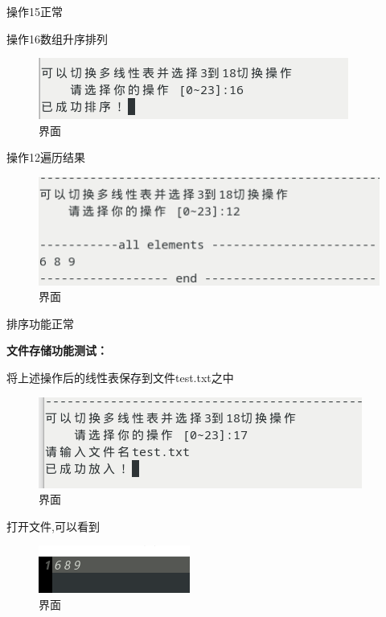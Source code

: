 \documentclass[supercite]{Experimental_Report}
\theoremstyle{definition}
\begin{document}
操作15正常

操作16数组升序排列

\begin{figure}[!htb]
	\begin{center}
		\includegraphics[scale=0.60]{images/1-27.png}
		\caption{界面}
		\label{fig1-27}
		\end{center}
\end{figure}

操作12遍历结果

\begin{figure}[!htb]
	\begin{center}
		\includegraphics[scale=0.60]{images/1-28.png}
		\caption{界面}
		\label{fig1-28}
		\end{center}
\end{figure}

排序功能正常

\textbf{文件存储功能测试：}

将上述操作后的线性表保存到文件test.txt之中

\begin{figure}[!htb]
	\begin{center}
		\includegraphics[scale=0.60]{images/1-29.png}
		\caption{界面}
		\label{fig1-29}
		\end{center}
\end{figure}

打开文件,可以看到

\begin{figure}[!htb]
	\begin{center}
		\includegraphics[scale=0.60]{images/1-30.png}
		\caption{界面}
		\label{fig1-30}
		\end{center}
\end{figure}
\end{document}
